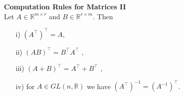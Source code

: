 {\color{navy}
	
\textbf{\large Computation Rules for Matrices II}\\

Let $A\in\mathbb{R}^{m\times r}$ and $B\in\mathbb{R}^{r\times m}$. Then
\begin{itemize}
    \item[i)] $(A^\top)^\top =A$,
    \item[ii)] $(AB)^\top=B^\top A^\top$ ,
    \item[iii)] $(A+B)^\top= A^\top + B^\top$ ,
    \item[iv)] for $A\in GL(n,\mathbb{R})$ we have $(A^{\top})^{-1}=(A^{-1})^{\top}$.
\end{itemize}
}